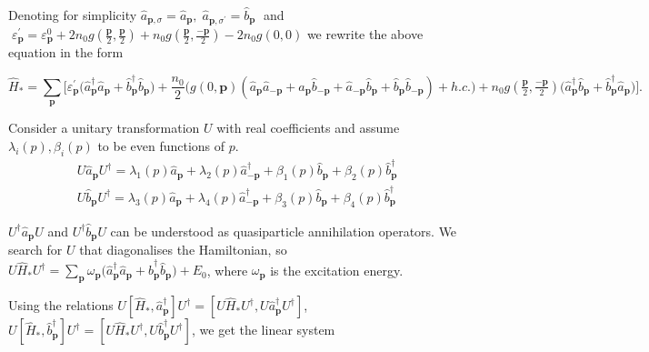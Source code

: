 \documentclass[reprint,superscriptaddress,showpacs,nofootinbib,aps,pra]{revtex4-1}
\begin{document}
Denoting for simplicity $  \hat{a}_{{\bm p},\sigma} = \hat{a}_{{\bm p}},
  \; \hat{a}_{{\bm p},\sigma^\prime} = \hat{b}_{{\bm p}}
  \; $ and $ \; \varepsilon^\prime_{\bm p} = \varepsilon_{\bm p}^0 + 2 n_0 g(\tfrac{{\bm p}}2,\tfrac{{\bm p}}2) + n_0 g(\tfrac{{\bm p}}2,\tfrac{\bm{-p}}2) - 2 n_0 g(0,0)$ we rewrite the above equation in the form
  \begin{widetext}
\begin{equation*}
\hat{H}_{\ast}=\sum_{{\bm p}} \Big[ \varepsilon_{\bm p}^\prime \big( \hat{a}_{{\bm p}}^{\dag}
  \hat{a}_{{\bm p}} + \hat{b}_{{\bm p}}^{\dag}\hat{b}_{{\bm p}} \big) + 
  \frac{n_0}{2} \big( g(0,{\bm p}) (\hat{a}_{{\bm p}}\hat{a}_{\bm{-p}} +  \hat{a}_{{\bm p}}\hat{b}_{\bm{-p}} + \hat{a}_{\bm{-p}}\hat{b}_{{\bm p}}+ \hat{b}_{{\bm p}}\hat{b}_{\bm{-p}}) + h.c. \big)  + n_0 g(\tfrac{{\bm p}}2,\tfrac{\bm{-p}}2) \big( \hat{a}_{{\bm p}}^{\dag} \hat{b}_{{\bm p}} + \hat{b}_{{\bm p}}^{\dag} \hat{a}_{{\bm p}}\big) \Big].
\end{equation*}
\end{widetext}

Consider a unitary transformation $U$ with real coefficients and assume $\lambda_i(p), \beta_i(p)$ to be even functions of $p$.
\begin{eqnarray*}
 U \hat{a}_{{\bm p}} U^\dag = \lambda_1(p) \hat{a}_{{\bm p}} + \lambda_2(p) \hat{a}_{\bm{-p}}^\dag + \beta_1(p) \hat{b}_{{\bm p}} + \beta_2(p) \hat{b}_{{\bm p}}^\dag \\
U \hat{b}_{{\bm p}} U^\dag = \lambda_3(p) \hat{a}_{{\bm p}} + \lambda_4(p) \hat{a}_{\bm{-p}}^\dag + \beta_3(p) \hat{b}_{{\bm p}} + \beta_4(p) \hat{b}_{{\bm p}}^\dag 
\end{eqnarray*}

$U^\dag \hat{a}_{{\bm p}} U$ and $U^\dag \hat{b}_{{\bm p}} U$ can be understood as quasiparticle annihilation operators. We search for $U$ that diagonalises the Hamiltonian, so $U \hat{H}_{\ast} U^\dag  =  \sum_{{\bm p}}\omega_{\bm p}\big( \hat{a}_{{\bm p}}^{\dag} \hat{a}_{{\bm p}} + \hat{b}_{{\bm p}}^{\dag}\hat{b}_{{\bm p}} \big) + E_0$, where $\omega_{\bm p}$ is the excitation energy.

Using the relations $U[ \hat{H}_{\ast}, \hat{a}_{{\bm p}}^\dag] U^\dag =[ U \hat{H}_{\ast} U^\dag, U \hat{a}_{{\bm p}}^\dag U^\dag]$, $U[ \hat{H}_{\ast}, \hat{b}_{{\bm p}}^\dag] U^\dag =[ U \hat{H}_{\ast} U^\dag, U \hat{b}_{{\bm p}}^\dag U^\dag]$, we get the linear system 
\end{document}
